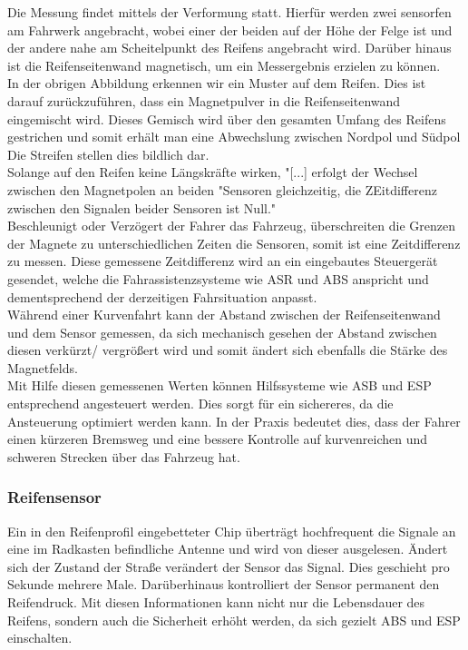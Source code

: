 \documentclass{article}
\begin{document}
				\begin{flushleft}
					
					Die Messung findet mittels der Verformung statt. Hierfür werden zwei sensorfen am Fahrwerk angebracht, wobei einer der beiden auf der Höhe der Felge ist und der andere nahe am Scheitelpunkt des Reifens angebracht wird. Darüber hinaus ist die Reifenseitenwand magnetisch, um ein Messergebnis erzielen zu können.\\
					In der obrigen Abbildung erkennen wir ein Muster auf dem Reifen. Dies ist darauf zurückzuführen, dass ein Magnetpulver in die Reifenseitenwand eingemischt wird. Dieses Gemisch wird über den gesamten Umfang des Reifens gestrichen und somit erhält man eine Abwechslung zwischen Nordpol und Südpol Die Streifen stellen dies bildlich dar.\\
					Solange auf den Reifen keine Längskräfte wirken, "[...] erfolgt der Wechsel zwischen den Magnetpolen an beiden "Sensoren gleichzeitig, die ZEitdifferenz zwischen den Signalen beider Sensoren ist Null."\cite{TS20} \\
					Beschleunigt oder Verzögert der Fahrer das Fahrzeug, überschreiten die Grenzen der Magnete zu unterschiedlichen Zeiten die Sensoren, somit ist eine Zeitdifferenz zu messen. Diese gemessene Zeitdifferenz wird an ein eingebautes Steuergerät gesendet, welche die Fahrassistenzsysteme wie ASR und ABS anspricht und dementsprechend der derzeitigen Fahrsituation anpasst.\\
					Während einer Kurvenfahrt kann der Abstand zwischen der Reifenseitenwand und dem Sensor gemessen, da sich mechanisch gesehen der Abstand zwischen diesen verkürzt/ vergrößert wird und somit ändert sich ebenfalls die Stärke des Magnetfelds.\\
					Mit Hilfe diesen gemessenen Werten können Hilfssysteme wie ASB und ESP entsprechend angesteuert werden. Dies sorgt für ein sichereres, da die Ansteuerung optimiert werden kann. In der Praxis bedeutet dies, dass der Fahrer einen kürzeren Bremsweg und eine bessere Kontrolle auf kurvenreichen und schweren Strecken über das Fahrzeug hat.
					
				\end{flushleft}
				
			\subsubsection{Reifensensor}
				Ein in den Reifenprofil eingebetteter Chip überträgt hochfrequent die Signale an eine im Radkasten befindliche Antenne und wird von dieser ausgelesen. Ändert sich der Zustand der Straße verändert der Sensor das Signal. Dies geschieht pro Sekunde mehrere Male. Darüberhinaus kontrolliert der Sensor permanent den Reifendruck. Mit diesen Informationen kann nicht nur die Lebensdauer des Reifens, sondern auch die Sicherheit erhöht werden, da sich gezielt ABS und ESP einschalten.\\
				
\end{document}
